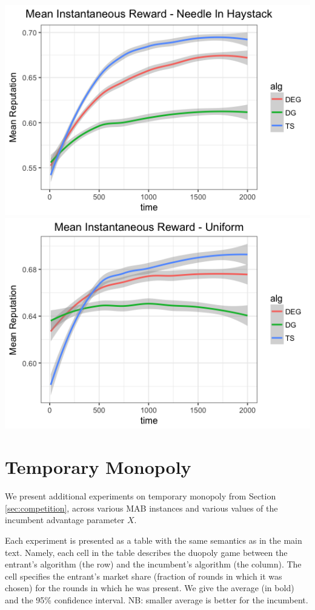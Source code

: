\documentclass[../competing_bandits_with_appendix.tex]{subfiles}
\begin{document}
\begin{appendices}
\begin{center}
\includegraphics[scale=0.25]{appendix_figures/mean_inst_reward_nih}
\includegraphics[scale=0.25]{appendix_figures/mean_inst_reward_uniform}
\end{center}

\section{Temporary Monopoly}

We present additional experiments on temporary monopoly from Section \ref{sec:competition}, across various MAB instances and various values of the incumbent advantage parameter $X$.

Each experiment is presented as a table with the same semantics as in the main text. Namely, each cell in the table describes the duopoly game between the entrant's algorithm (the row) and the incumbent's algorithm (the column). The cell specifies the entrant's market share (fraction of rounds in which it was chosen) for the rounds in which he was present. We give the average (in bold) and the 95\% confidence interval. NB: smaller average is better for the incumbent.


\end{appendices}
\end{document}
